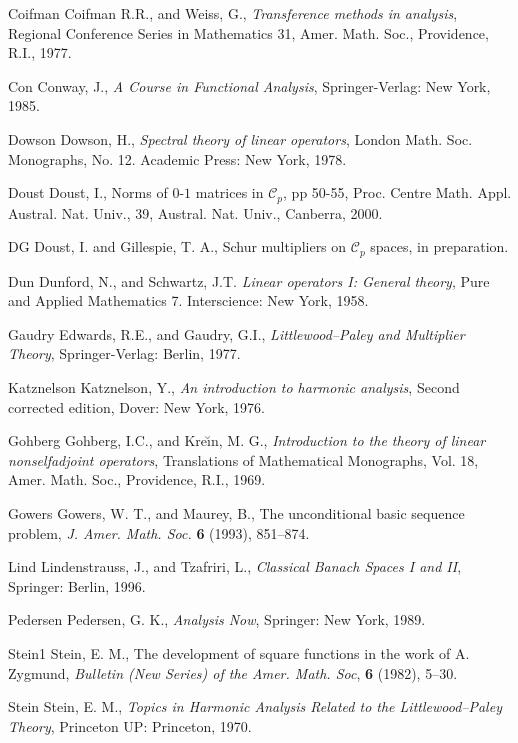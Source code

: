 \documentclass[honours,12pt]{unswthesis}
\newcommand{\CC}{\mathcal{C}}
\numberwithin{equation}{section}
\begin{document}
\begin{thebibliography}{999}
\bibitem
{Coifman} Coifman R.R., and Weiss, G.,
\textit{Transference methods in analysis},
Regional Conference Series in Mathematics 31,
Amer. Math. Soc., Providence, R.I., 1977.

\bibitem
{Con} Conway, J.,
\textit{A Course in Functional Analysis},
Springer-Verlag: New York, 1985.

\bibitem
{Dowson} Dowson, H.,
\textit{Spectral theory of linear operators},
London Math. Soc. Monographs, No. 12. Academic Press: New York, 1978.

\bibitem
{Doust} 
Doust, I., Norms of $0$-$1$ matrices in $\CC_p$,  pp 50-55, Proc.
Centre Math. Appl. Austral. Nat. Univ., 39, Austral. Nat. Univ.,
Canberra, 2000.

\bibitem
{DG} Doust, I.  and Gillespie, T. A.,
Schur multipliers on $\CC_p$ spaces,
in preparation.

\bibitem
{Dun} Dunford, N., and Schwartz, J.T.
\textit{Linear operators I: General theory},
Pure and Applied Mathematics 7. Interscience: New York, 1958.

\bibitem
{Gaudry} Edwards, R.E., and Gaudry, G.I.,
\textit{Littlewood--Paley and Multiplier Theory},
Springer-Verlag: Berlin, 1977.

\bibitem
{Katznelson}
Katznelson, Y.,
\textit{An introduction to harmonic analysis},
Second corrected edition, Dover: New York, 1976.

\bibitem
{Gohberg}
Gohberg, I.C., and Kre\u{\i}n, M. G.,
\textit{Introduction to the theory of linear nonselfadjoint operators},
Translations of Mathematical Monographs, Vol. 18, Amer. Math. Soc.,
Providence, R.I., 1969.

\bibitem
{Gowers} Gowers, W. T., and Maurey, B.,
The unconditional basic sequence problem,
\textit{J. Amer. Math. Soc.} \textbf{6} (1993), 851--874.

\bibitem
{Lind}
Lindenstrauss, J., and Tzafriri, L.,
\textit{Classical Banach Spaces I and II},
Springer: Berlin, 1996.

\bibitem
{Pedersen}
Pedersen, G. K.,
\textit{Analysis Now},
Springer: New York, 1989.

\bibitem
{Stein1}
Stein, E. M.,
The development of square functions in the work of A. Zygmund,
\textit{Bulletin (New Series) of the Amer. Math. Soc},
\textbf{6} (1982), 5--30.

\bibitem
{Stein}
Stein, E. M.,
\textit{Topics in Harmonic Analysis Related to the Littlewood--Paley Theory},
Princeton UP: Princeton, 1970.

\end{thebibliography}
\end{document}
